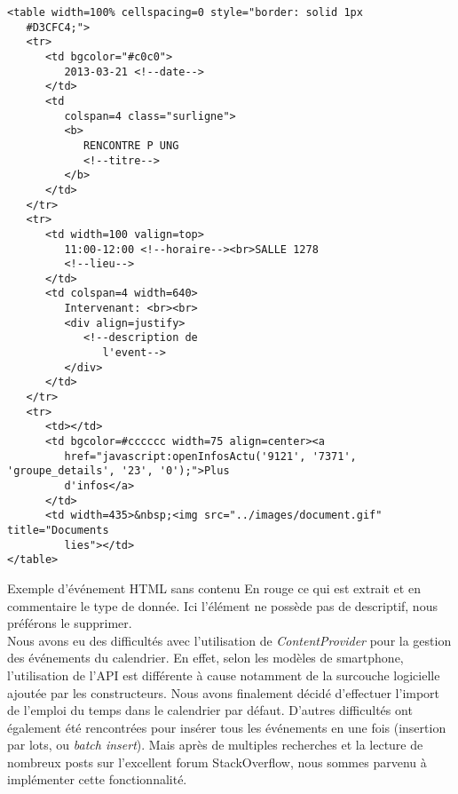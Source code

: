 \begin{adjustbox}{minipage=1.14\textwidth,margin=0pt \smallskipamount,center}
\begin{lstlisting}[style=HTML, label=htmlCode]
<table width=100% cellspacing=0 style="border: solid 1px 
   #D3CFC4;">
   <tr>
      <td bgcolor="#c0c0">
         2013-03-21 <!--date-->
      </td>
      <td
         colspan=4 class="surligne">
         <b>
            RENCONTRE P UNG
            <!--titre-->
         </b>
      </td>
   </tr>
   <tr>
      <td width=100 valign=top>
         11:00-12:00 <!--horaire--><br>SALLE 1278
         <!--lieu-->
      </td>
      <td colspan=4 width=640>
         Intervenant: <br><br>
         <div align=justify>
            <!--description de
               l'event-->
         </div>
      </td>
   </tr>
   <tr>
      <td></td>
      <td bgcolor=#cccccc width=75 align=center><a
         href="javascript:openInfosActu('9121', '7371', 'groupe_details', '23', '0');">Plus
         d'infos</a>
      </td>
      <td width=435>&nbsp;<img src="../images/document.gif" title="Documents 
         lies"></td>
</table>
\end{lstlisting}
\end{adjustbox}

Exemple d'événement HTML sans contenu
En rouge ce qui est extrait et en commentaire le type de donnée. Ici l’élément ne possède pas de descriptif, nous préférons le supprimer. \\

Nous avons eu des difficultés avec l’utilisation de \emph{ContentProvider} pour la gestion des événements du calendrier. En effet, selon les modèles de smartphone, l’utilisation de l’API est différente à cause notamment de la surcouche logicielle ajoutée par les constructeurs. Nous avons finalement décidé d’effectuer l’import de l’emploi du temps dans le calendrier par défaut. D’autres difficultés ont également été rencontrées pour insérer tous les événements en une fois (insertion par lots, ou \emph{batch insert}). Mais après de multiples recherches et la lecture de nombreux posts sur l’excellent forum StackOverflow, nous sommes parvenu à implémenter cette fonctionnalité.

